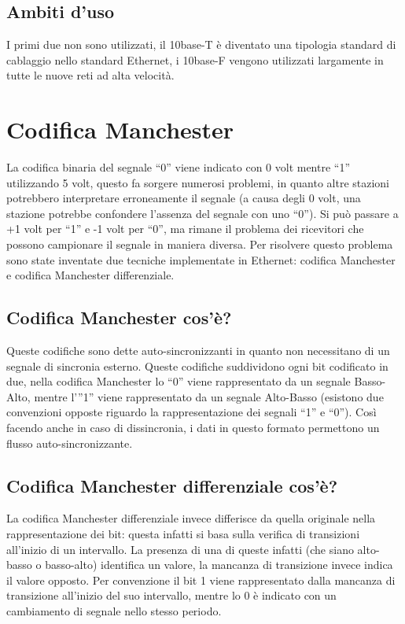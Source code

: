 \subsection{Ambiti d'uso}
I primi due non sono utilizzati, il 10base-T è diventato una tipologia standard di cablaggio nello standard Ethernet, i 10base-F vengono utilizzati largamente in tutte le nuove reti ad alta velocità.

\section{Codifica Manchester}

La codifica binaria del segnale “0” viene indicato con 0 volt mentre “1” utilizzando 5 volt, questo fa sorgere numerosi problemi, in quanto altre stazioni potrebbero interpretare erroneamente il segnale (a causa degli 0 volt, una stazione potrebbe confondere l’assenza del segnale con uno “0”). Si può passare a +1 volt per “1” e -1 volt per “0”, ma rimane il problema dei ricevitori che possono campionare il segnale in maniera diversa.
Per risolvere questo problema sono state inventate due tecniche implementate in Ethernet: codifica Manchester e codifica Manchester differenziale.
\subsection{Codifica Manchester cos'è?}
Queste codifiche sono dette auto-sincronizzanti in quanto non necessitano di un segnale di sincronia esterno.
Queste codifiche suddividono ogni bit codificato in due, nella codifica Manchester lo “0” viene rappresentato da un segnale Basso-Alto, mentre l’”1” viene rappresentato da un segnale Alto-Basso (esistono due convenzioni opposte riguardo la rappresentazione dei segnali “1” e “0”).
Così facendo anche in caso di dissincronia, i dati in questo formato permettono un flusso auto-sincronizzante.
\subsection{Codifica Manchester differenziale cos'è?}
La codifica Manchester differenziale invece differisce da quella originale nella rappresentazione dei bit: questa infatti si basa sulla verifica di transizioni all’inizio di un intervallo. La presenza di una di queste infatti (che siano alto-basso o basso-alto) identifica un valore, la mancanza di transizione invece indica il valore opposto. Per convenzione il bit 1 viene rappresentato dalla mancanza di transizione all’inizio del suo intervallo, mentre lo 0 è indicato con un cambiamento di segnale nello stesso periodo.

